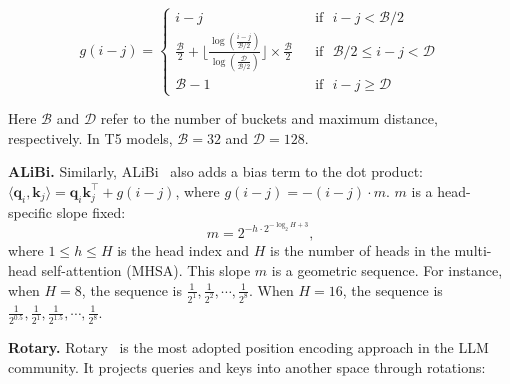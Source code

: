 \begin{equation}
    g(i-j)=\left\{
    \begin{array}{lcl}
        i-j & &\textrm{if} \,\,\,\, i-j < \mathcal{B}/2 \\
        \frac{\mathcal{B}}{2} + \lfloor\frac{\log(\frac{i-j}{\mathcal{B}/2})}{\log(\frac{\mathcal{D}}{\mathcal{B}/2})}\rfloor\times \frac{\mathcal{B}}{2} && \textrm{if} \,\,\,\, \mathcal{B}/2 \leq i-j < \mathcal{D}\\
        \mathcal{B}-1 && \textrm{if} \,\,\,\, i-j\geq\mathcal{D}
    \end{array}
    \right.
\end{equation}

Here $\mathcal{B}$ and $\mathcal{D}$ refer to the number of buckets and maximum distance, respectively. In T5 models, $\mathcal{B}=\textrm{32}$ and $\mathcal{D}=\textrm{128}$.


\textbf{ALiBi.} Similarly, ALiBi~\citep{press2021train} also adds a bias term to the dot product: $\langle\boldsymbol{q}_i\textrm{,}\,\boldsymbol{k}_j\rangle=\boldsymbol{q}_i\boldsymbol{k}_j^\top+g(i-j)$, where $g(i-j)=-(i-j)\cdot m$. $m$ is a head-specific slope fixed:
\begin{equation}
    m=2^{-h\cdot 2^{-\log_2 H +3}}\textrm{,}
\end{equation}
where $1\leq h\leq H$ is the head index and $H$ is the number of heads in the multi-head self-attention (MHSA). This slope $m$ is a geometric sequence. For instance, when $H=8$, the sequence is $\frac{1}{2^1}\textrm{,}\,\frac{1}{2^2}\textrm{,}\,\cdots\textrm{,}\,\frac{1}{2^8}$. When $H=16$, the sequence is $\frac{1}{2^{0.5}}\textrm{,}\,\frac{1}{2^1}\textrm{,}\,\frac{1}{2^{1.5}}\textrm{,}\,\cdots\textrm{,}\,\frac{1}{2^8}$.

\textbf{Rotary.} Rotary~\citep{su2024roformer} is the most adopted position encoding approach in the LLM community. It projects queries and keys into another space through rotations: 

